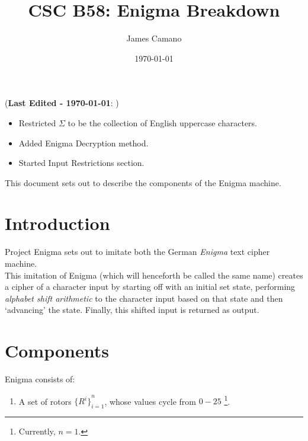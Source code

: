 \documentclass[12pt,a4paper]{article}
\title{CSC B58: Enigma Breakdown}
\date{\today}
\author{James Camano}
\newcommand{\lastedited}[1]{(\textbf{Last Edited - \today{}}: \emph{#1})}
\begin{document}
	\maketitle
	\lastedited{}
	\begin{itemize}
		\item Restricted $\Sigma$ to be the collection of English uppercase characters.
		\item Added Enigma Decryption method.
		\item Started Input Restrictions section.
	\end{itemize}

	This document sets out to describe the components of the Enigma machine. \\
	\section{Introduction}
 	Project Enigma sets out to imitate both the German \emph{Enigma} text cipher machine.  \\

	This imitation of Enigma (which will henceforth be called the same name) creates a cipher of a character input by starting off with an initial set state, performing \emph{alphabet shift arithmetic} to the character input based on that state and then `advancing' the state. Finally, this shifted input is returned as output.
	
	\section{Components}
	Enigma consists of:

	\begin{enumerate}
		\item A set of rotors ${\{R^i\}}_{i=1}^{n}$, whose values cycle from $0-25$ \footnote{Currently, $n=1$. }. 
	\end{enumerate}
\end{document}

